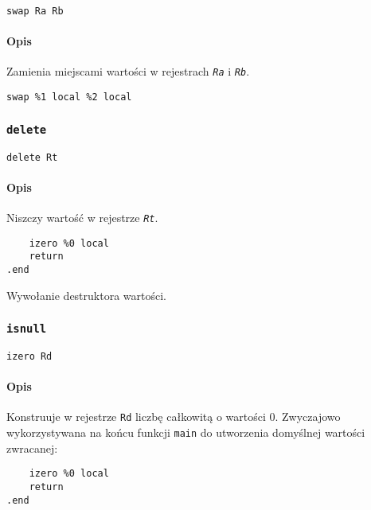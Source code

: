 \begin{lstlisting}
swap Ra Rb
\end{lstlisting}

\paragraph*{Opis} Zamienia miejscami wartości w rejestrach \texttt{\emph{Ra}} i
\texttt{\emph{Rb}}.

\begin{lstlisting}
swap %1 local %2 local
\end{lstlisting}

\subsubsection{\texttt{delete}}

\begin{lstlisting}
delete Rt
\end{lstlisting}

\paragraph*{Opis} Niszczy wartość w rejestrze \texttt{\emph{Rt}}.

\begin{lstlisting}
	izero %0 local
	return
.end
\end{lstlisting}

Wywołanie destruktora wartości.

\subsubsection{\texttt{isnull}}

\begin{lstlisting}
izero Rd
\end{lstlisting}

\paragraph*{Opis} Konstruuje w rejestrze \texttt{Rd} liczbę całkowitą o wartości 0.
Zwyczajowo wykorzystywana na końcu funkcji \texttt{main} do utworzenia domyślnej wartości zwracanej:

\begin{lstlisting}
	izero %0 local
	return
.end
\end{lstlisting}
